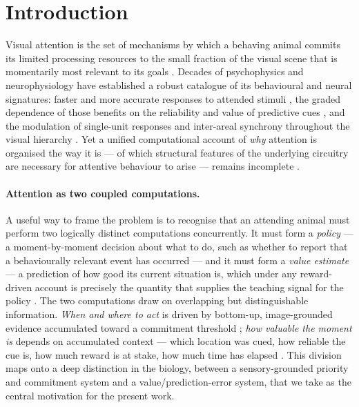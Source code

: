 \section{Introduction}
\label{sec:intro}

Visual attention is the set of mechanisms by which a behaving animal commits its
limited processing resources to the small fraction of the visual scene that is
momentarily most relevant to its goals \citep{carrasco2011visual,
desimone1995neural, reynolds2009normalization, rust2022priority}. Decades of
psychophysics and neurophysiology have established a robust catalogue of its
behavioural and neural signatures: faster and more accurate responses to attended
stimuli \citep{posner1980attention, carrasco2011visual, hawkins1990visual}, the
graded dependence of those benefits on the reliability and value of predictive
cues \citep{mayo2016graded, eckstein2013visual}, and the modulation of single-unit
responses and inter-areal synchrony throughout the visual hierarchy
\citep{reynolds2000attention, treue1999reshaping, fries2001modulation,
gregoriou2009high}. Yet a unified computational account of \emph{why} attention is
organised the way it is --- of which structural features of the underlying
circuitry are necessary for attentive behaviour to arise --- remains incomplete
\citep{mehrani2023self, hassanin2024visual, lindsay2020attention}.

\paragraph{Attention as two coupled computations.}
A useful way to frame the problem is to recognise that an attending animal must
perform two logically distinct computations concurrently. It must form a
\emph{policy} --- a moment-by-moment decision about what to do, such as whether to
report that a behaviourally relevant event has occurred --- and it must form a
\emph{value estimate} --- a prediction of how good its current situation is, which
under any reward-driven account is precisely the quantity that supplies the
teaching signal for the policy \citep{sutton2018reinforcement, dayan2008decision,
niv2009reinforcement}. The two computations draw on overlapping but distinguishable
information. \emph{When and where to act} is driven by bottom-up, image-grounded
evidence accumulated toward a commitment threshold
\citep{gold2007neural, roitman2002response, ding2011neural}; \emph{how valuable the
moment is} depends on accumulated context --- which location was cued, how reliable
the cue is, how much reward is at stake, how much time has elapsed
\citep{platt1999neural, sugrue2004matching, stanisor2013neural}. This division maps
onto a deep distinction in the biology, between a sensory-grounded priority and
commitment system and a value/prediction-error system, that we take as the central
motivation for the present work.

